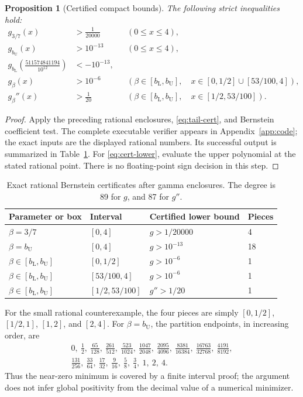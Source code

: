 \documentclass[11pt,a4paper]{article}
\numberwithin{equation}{section}
\newtheorem{proposition}[theorem]{Proposition}
\theoremstyle{definition}\newtheorem{definition}[theorem]{Definition}
\theoremstyle{remark}\newtheorem{remark}[theorem]{Remark}
\newcommand{\bL}{b_{\mathrm L}}
\newcommand{\bU}{b_{\mathrm U}}
\begin{document}
\begin{proposition}[Certified compact bounds]\label{prop:certified}
The following strict inequalities hold:
\begin{align}
 g_{3/7}(x)&>\frac1{20000} &&(0\le x\le4),\label{eq:cert-main}\\
 g_{\bU}(x)&>10^{-13} &&(0\le x\le4),\label{eq:cert-upper}\\
 g_{\bL}\!\left(\frac{511574841194}{10^{12}}\right)
 &<-10^{-13},\label{eq:cert-lower}\\
 g_\beta(x)&>10^{-6}
 &&\left(\beta\in[\bL,\bU],\quad
 x\in[0,1/2]\cup[53/100,4]\right),\label{eq:cert-outside}\\
 g_\beta''(x)&>\frac1{20}
 &&\left(\beta\in[\bL,\bU],\quad
 x\in[1/2,53/100]\right).\label{eq:cert-convex}
\end{align}
\end{proposition}

\begin{proof}
Apply the preceding rational enclosures, \eqref{eq:tail-cert}, and
Bernstein coefficient test. The complete executable verifier appears
in Appendix~\ref{app:code}; the exact inputs are the displayed rational
numbers. Its successful output is summarized in Table~\ref{tab:cert}.
For \eqref{eq:cert-lower}, evaluate the upper polynomial at the stated
rational point. There is no floating-point sign decision in this step.
\end{proof}

\begin{table}[ht]
\centering\small
\begin{tabular}{@{}llll@{}}
\toprule
Parameter or box & Interval & Certified lower bound & Pieces\\
\midrule
\(\beta=3/7\) & \([0,4]\) & \(g>1/20000\) & 4\\
\(\beta=\bU\) & \([0,4]\) & \(g>10^{-13}\) & 18\\
\(\beta\in[\bL,\bU]\) & \([0,1/2]\) & \(g>10^{-6}\) & 1\\
\(\beta\in[\bL,\bU]\) & \([53/100,4]\) & \(g>10^{-6}\) & 1\\
\(\beta\in[\bL,\bU]\) & \([1/2,53/100]\) & \(g''>1/20\) & 1\\
\bottomrule
\end{tabular}
\caption{Exact rational Bernstein certificates after gamma enclosures.
The degree is 89 for \(g\), and 87 for \(g''\).}
\label{tab:cert}
\end{table}

For the small rational counterexample, the four pieces are simply
\([0,1/2]\), \([1/2,1]\), \([1,2]\), and \([2,4]\).
For \(\beta=\bU\), the partition endpoints, in increasing order, are
\begin{gather*}
0,\ \tfrac12,\ \tfrac{65}{128},\ \tfrac{261}{512},\
\tfrac{523}{1024},\ \tfrac{1047}{2048},\ \tfrac{2095}{4096},\
\tfrac{8381}{16384},\ \tfrac{16763}{32768},\ \tfrac{4191}{8192},\\
\tfrac{131}{256},\ \tfrac{33}{64},\ \tfrac{17}{32},\
\tfrac9{16},\ \tfrac58,\ \tfrac34,\ 1,\ 2,\ 4.
\end{gather*}
Thus the near-zero minimum is covered by a finite interval proof; the
argument does not infer global positivity from the decimal value of
a numerical minimizer.
\end{document}
